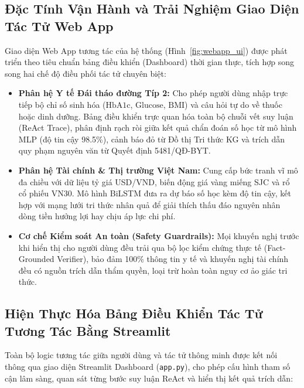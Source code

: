 \documentclass[12pt,a4paper]{report}
\begin{document}
\subsection{Đặc Tính Vận Hành và Trải Nghiệm Giao Diện Tác Tử Web App}

Giao diện Web App tương tác của hệ thống (Hình~\ref{fig:webapp_ui}) được phát triển theo tiêu chuẩn bảng điều khiển (Dashboard) thời gian thực, tích hợp song song hai chế độ điều phối tác tử chuyên biệt:
\begin{itemize}[itemsep=2pt, parsep=0pt, topsep=3pt]
    \item \textbf{Phân hệ Y tế Đái tháo đường Típ 2:} Cho phép người dùng nhập trực tiếp bộ chỉ số sinh hóa ($\text{HbA1c}$, $\text{Glucose}$, $\text{BMI}$) và câu hỏi tự do về thuốc hoặc dinh dưỡng. Bảng điều khiển trực quan hóa toàn bộ chuỗi vết suy luận (ReAct Trace), phân định rạch ròi giữa kết quả chẩn đoán số học từ mô hình MLP (độ tin cậy 98.5\%), cảnh báo đỏ từ Đồ thị Tri thức KG và trích dẫn quy phạm nguyên văn từ Quyết định 5481/QĐ-BYT.
    \item \textbf{Phân hệ Tài chính \& Thị trường Việt Nam:} Cung cấp bức tranh vĩ mô đa chiều với dữ liệu tỷ giá USD/VND, biến động giá vàng miếng SJC và rổ cổ phiếu VN30. Mô hình BiLSTM đưa ra dự báo số học kèm độ tin cậy, kết hợp với mạng lưới tri thức nhân quả để giải thích thấu đáo nguyên nhân dòng tiền hưởng lợi hay chịu áp lực chi phí.
    \item \textbf{Cơ chế Kiểm soát An toàn (Safety Guardrails):} Mọi khuyến nghị trước khi hiển thị cho người dùng đều trải qua bộ lọc kiểm chứng thực tế (Fact-Grounded Verifier), bảo đảm 100\% thông tin y tế và khuyến nghị tài chính đều có nguồn trích dẫn thẩm quyền, loại trừ hoàn toàn nguy cơ ảo giác tri thức.
\end{itemize}

\subsection{Hiện Thực Hóa Bảng Điều Khiển Tác Tử Tương Tác Bằng Streamlit}

Toàn bộ logic tương tác giữa người dùng và tác tử thông minh được kết nối thông qua giao diện Streamlit Dashboard (\texttt{app.py}), cho phép cấu hình tham số cận lâm sàng, quan sát từng bước suy luận ReAct và hiển thị kết quả trích dẫn:
\end{document}
